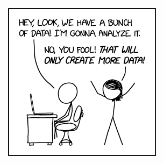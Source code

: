 \documentclass[11pt, letterpaper]{article}
\begin{document}

\begin{figure}[h]
	\centering
	\href{https://xkcd.com/2582/}{\includegraphics[width=0.35\textwidth]{img/data_trap.png}}
\end{figure}



\end{document}
